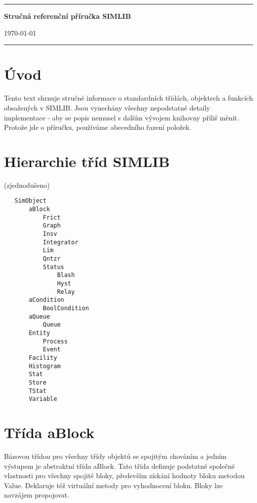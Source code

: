 \documentclass[a4paper]{article}
\begin{document}
\begin{titlepage}
\hrule
\vfill
\begin{center}

{\Huge\bf Stručná referenční příručka SIMLIB \\}


\bigskip                \today

\end{center}
\vfill
\hrule
\end{titlepage}



\section{Úvod}

Tento  text shrnuje  stručné informace  o standardních  třídách,
objektech a funkcích obsažených v SIMLIB. Jsou vynechány všechny
nepodstatné detaily implementace - aby se popis nemusel s dalším
vývojem knihovny příliš měnit. Protože jde o příručku, používáme
abecedního řazení položek.


\section{Hierarchie tříd SIMLIB}

(zjednodušeno)

\begin{verbatim}
   SimObject
       aBlock
           Frict
           Graph
           Insv
           Integrator
           Lim
           Qntzr
           Status
               Blash
               Hyst
               Relay
       aCondition
           BoolCondition
       aQueue
           Queue
       Entity
           Process
           Event
       Facility
       Histogram
       Stat
       Store
       TStat
       Variable
\end{verbatim}


\section{Třída aBlock}

Bázovou třídou pro všechny třídy objektů se spojitým chováním a jedním
výstupem je abstraktní třída aBlock. Tato třída definuje
podstatné společné vlastnosti pro všechny spojité bloky, především
získání hodnoty bloku metodou Value. Deklaruje též virtuální
metody pro vyhodnocení bloku. Bloky lze navzájem propojovat.
\end{document}
